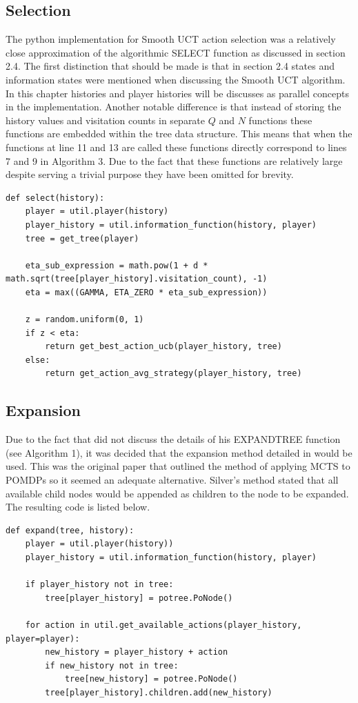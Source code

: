 \subsection{Selection}\label{subsec:selection}
The python implementation for Smooth UCT action selection was a relatively close approximation of the
algorithmic SELECT function as discussed in section 2.4.
The first distinction that should be made is that in section 2.4 states and information
states were mentioned when discussing the Smooth UCT algorithm.
In this chapter histories and player histories will be discusses as parallel concepts in the implementation.
Another notable difference is that instead of storing the history values and visitation
counts in separate $Q$ and $N$ functions these functions are embedded within the tree data
structure.
This means that when the functions at line 11 and 13 are called these
functions directly correspond to lines 7 and 9 in Algorithm 3.
Due to the fact that these functions are relatively large despite serving a trivial
purpose they have been omitted for brevity.

\begin{lstlisting}[style=Python]
def select(history):
    player = util.player(history)
    player_history = util.information_function(history, player)
    tree = get_tree(player)

    eta_sub_expression = math.pow(1 + d * math.sqrt(tree[player_history].visitation_count), -1)
    eta = max((GAMMA, ETA_ZERO * eta_sub_expression))

    z = random.uniform(0, 1)
    if z < eta:
        return get_best_action_ucb(player_history, tree)
    else:
        return get_action_avg_strategy(player_history, tree)
\end{lstlisting}


\subsection{Expansion}\label{subsec:expansion}
Due to the fact that\citep{heinrich2017reinforcement} did not discuss the details of his EXPANDTREE
function (see Algorithm 1), it was decided that the expansion method detailed
in\citep{silver2010monte} would be used.
This was the original paper that outlined the method of applying MCTS to POMDPs so it seemed
an adequate alternative.
Silver's method stated that all available child nodes would be appended as children to the node to be expanded.
The resulting code is listed below.

\begin{lstlisting}[style=Python]
def expand(tree, history):
    player = util.player(history))
    player_history = util.information_function(history, player)

    if player_history not in tree:
        tree[player_history] = potree.PoNode()

    for action in util.get_available_actions(player_history, player=player):
        new_history = player_history + action
        if new_history not in tree:
            tree[new_history] = potree.PoNode()
        tree[player_history].children.add(new_history)
\end{lstlisting}



